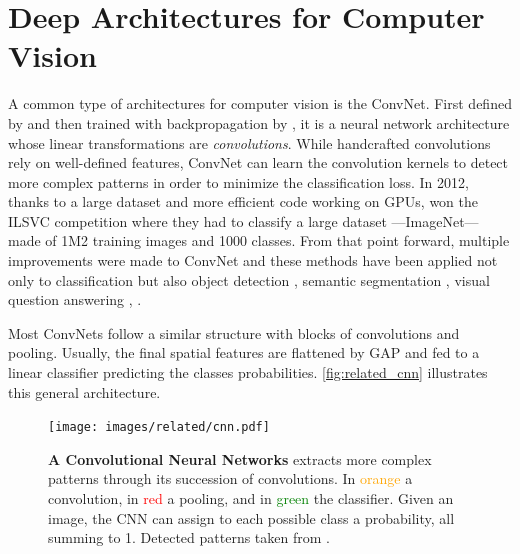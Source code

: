 \section{Deep Architectures for Computer Vision}

A common type of architectures for computer vision is the \acf{ConvNet}. First defined by
\cite{fukushima1980neocognitron} and then trained with backpropagation by \cite{lecun1999lenet}, it
is a neural network architecture whose linear transformations are \textit{convolutions}. While
handcrafted convolutions \citep{lowe1999sift} rely on well-defined features, \ac{ConvNet} can learn
the convolution kernels to detect more complex patterns in order to minimize the classification
loss. In 2012, thanks to a large dataset and more efficient code working on \acp{GPU},
\cite{krizhevsky2012alexnet} won the ILSVC competition \citep{russakovsky2015imagenet_ilsvrc} where
they had to classify a large dataset ---ImageNet--- made of 1M2 training images and 1000 classes.
From that point forward, multiple improvements were made to \ac{ConvNet}
\citep{ioffe2015batchnorm,he2016resnet} and these methods have been applied not only to
classification but also object detection \citep{ren20fasterrcnn}, semantic segmentation
\citep{chen2018deeplab}, visual question answering \citep{antol2015vqa}, \etc.

Most \acp{ConvNet} follow a similar structure with blocks of convolutions and pooling. Usually, the
final spatial features are flattened by \ac{GAP} and fed to a linear classifier
predicting the classes probabilities. \autoref{fig:related_cnn} illustrates this general architecture.

\begin{figure}[tb]
      \begin{center}
            \texttt{[image: images/related/cnn.pdf]}
      \end{center}
      \caption{\textbf{A Convolutional Neural Networks} extracts more complex patterns through its
            succession of convolutions. In \textcolor{orange}{orange} a convolution, in \textcolor{red}{red}
            a pooling, and in \textcolor{green}{green} the classifier. Given an image, the \ac{CNN} can assign to
            each possible class a probability, all summing to 1.
            Detected patterns taken from \cite{olah2017feature}.}
      \label{fig:related_cnn}
\end{figure}


